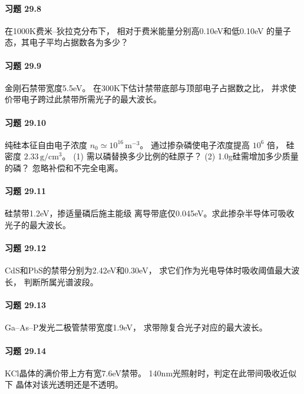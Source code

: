 \paragraph{习题 29.8}
在1000K费米--狄拉克分布下，
相对于费米能量分别高0.10eV和低0.10eV
的量子态，其电子平均占据数各为多少？
\paragraph{习题 29.9}
金刚石禁带宽度5.5eV。
在300K下估计禁带底部与顶部电子占据数之比，
并求使价带电子跨过此禁带所需光子的最大波长。
\paragraph{习题 29.10}
纯硅本征自由电子浓度
\(n_0\simeq10^{16}\,\mathrm{m^{-3}}\)。
通过掺杂磷使电子浓度提高 \(10^6\) 倍，
硅密度 \(2.33\,\mathrm{g/cm^3}\)。
(1) 需以磷替换多少比例的硅原子？
(2) 1.0g硅需增加多少质量的磷？
忽略补偿和不完全电离。
\paragraph{习题 29.11}
硅禁带1.2eV，掺适量磷后施主能级
离导带底仅0.045eV。求此掺杂半导体可吸收
光子的最大波长。
\paragraph{习题 29.12}
CdS和PbS的禁带分别为2.42eV和0.30eV，
求它们作为光电导体时吸收阈值最大波长，
判断所属光谱波段。
\paragraph{习题 29.13}
Ga--As--P发光二极管禁带宽度1.9eV，
求带隙复合光子对应的最大波长。
\paragraph{习题 29.14}
KCl晶体的满价带上方有宽7.6eV禁带。
140nm光照射时，判定在此带间吸收近似下
晶体对该光透明还是不透明。
